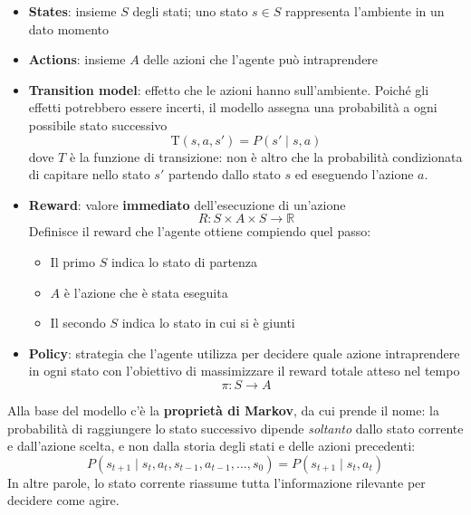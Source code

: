 \documentclass[a4paper, 11pt, oneside]{book}
\theoremstyle{definition}
\begin{document}
	\begin{itemize}
		\item \textbf{States}: insieme $S$ degli stati; uno stato $s \in S$
			rappresenta l'ambiente in un dato momento

		\item \textbf{Actions}: insieme $A$ delle azioni che l'agente pu\`o intraprendere

		\item \textbf{Transition model}: effetto che le azioni hanno sull'ambiente.
			Poich\'e gli effetti potrebbero essere incerti, il modello assegna
			una probabilit\`a a ogni possibile stato successivo
			\begin{displaymath}
				\text{T}(s, a, s') = P(s' \mid s, a)
			\end{displaymath}
			dove $T$ \`e la funzione di transizione: non \`e altro che la probabilit\`a
			condizionata di capitare nello stato $s'$ partendo dallo stato $s$ ed eseguendo
			l'azione $a$.

		\item \textbf{Reward}: valore \textbf{immediato} dell'esecuzione di un'azione
			\begin{displaymath}
				R: S \times A \times S \rightarrow \mathbb{R}
			\end{displaymath}
			Definisce il reward che l'agente ottiene compiendo quel passo:
			\begin{itemize}
				\item Il primo $S$ indica lo stato di partenza

				\item $A$ \`e l'azione che \`e stata eseguita

				\item Il secondo $S$ indica lo stato in cui si \`e giunti
			\end{itemize}

		\item \textbf{Policy}: strategia che l'agente utilizza per decidere quale azione
			intraprendere in ogni stato con l'obiettivo di massimizzare il reward totale
			atteso nel tempo
			\begin{displaymath}
				\pi : S \rightarrow A
			\end{displaymath}
	\end{itemize}

	Alla base del modello c'\`e la \textbf{propriet\`a di Markov}, da cui prende
	il nome: la probabilit\`a di raggiungere lo stato successivo dipende \emph{soltanto}
	dallo stato corrente e dall'azione scelta, e non dalla storia degli stati e delle
	azioni precedenti:
	\begin{displaymath}
		P(s_{t+1}\mid s_{t}, a_{t}, s_{t-1}, a_{t-1}, \dots, s_{0}) = P(s_{t+1}\mid s
		_{t}, a_{t})
	\end{displaymath}
	In altre parole, lo stato corrente riassume tutta l'informazione rilevante per
	decidere come agire.
\end{document}
